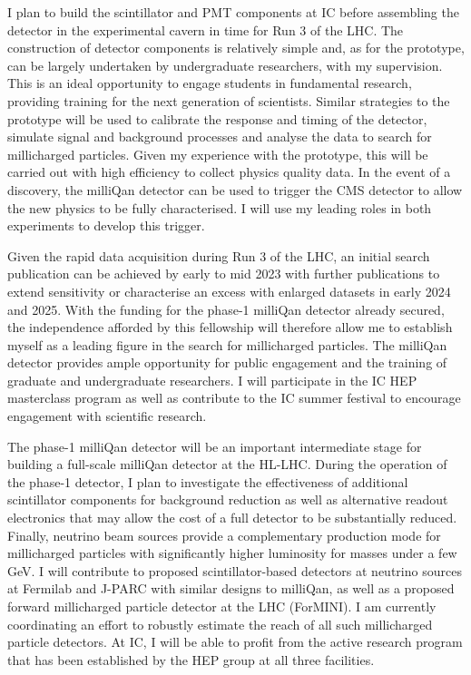 \documentclass[11pt,a4paper]{article}
\theoremstyle{plain} \numberwithin{equation}{section}
\theoremstyle{definition}
\begin{document}
I plan to build the scintillator and PMT
components at IC before assembling the detector in the experimental cavern
in time for Run 3 of the LHC. 
The construction of detector
components is relatively simple and, as for the prototype, can be largely undertaken
by undergraduate researchers, with my supervision. This is an ideal 
opportunity to engage students in fundamental research, providing training 
for the next generation of scientists. Similar strategies to the prototype will be used to 
calibrate the response and timing of the 
detector, simulate signal and background processes and analyse the data to 
search for millicharged particles. Given my experience with the
prototype, this will be carried out with high efficiency to collect physics quality
data. In the event of a discovery, the milliQan 
detector can be used to trigger the CMS detector to allow the new physics to be fully characterised. 
I will use my leading roles in both experiments to develop this trigger.

Given the rapid data acquisition during Run 3 of the LHC, 
an initial search publication can be achieved by early to mid 2023 
with further publications to extend sensitivity or characterise 
an excess with enlarged datasets 
in early 2024 and 2025. With the funding for the phase-1 
milliQan detector already secured, the independence 
afforded by this fellowship will therefore allow me to establish myself as a 
leading figure in the search for millicharged particles.
The milliQan detector provides ample opportunity for public engagement 
and the training of graduate and undergraduate researchers. I will participate in the 
IC HEP masterclass program
as well as contribute to the IC summer festival to encourage engagement 
with scientific research.

The phase-1 milliQan detector will be an important intermediate stage for building 
a full-scale milliQan detector at the HL-LHC. During the operation of the phase-1 detector,
I plan to investigate the effectiveness of additional scintillator components for background
reduction as well as alternative readout electronics that may allow the cost of a full
detector to be substantially reduced. Finally, neutrino beam sources provide a 
complementary production mode for 
millicharged particles with significantly higher luminosity for masses under a few GeV. 
I will contribute to proposed scintillator-based detectors at neutrino sources at
Fermilab and J-PARC with similar designs to milliQan, as well as a proposed 
forward millicharged particle detector at the LHC (ForMINI). I am currently coordinating an effort to
robustly estimate the reach of all such millicharged particle detectors.
At IC, I will be able to profit from the active research program that
has been established by the HEP group at all three facilities. 
\end{document}
